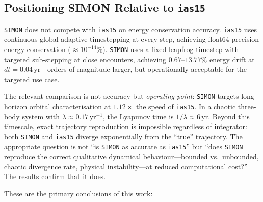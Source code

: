 \documentclass[12pt]{article}
\begin{document}
\subsection{Positioning SIMON Relative to \texttt{ias15}}

\texttt{SIMON} does not compete with \texttt{ias15} on energy conservation accuracy.
\texttt{ias15} uses continuous global adaptive timestepping at every step, achieving
float64-precision energy conservation ($\approx 10^{-14}\%$). \texttt{SIMON} uses a
fixed leapfrog timestep with targeted sub-stepping at close encounters, achieving
$0.67$--$13.77\%$ energy drift at $dt = 0.04$\,yr---orders of magnitude larger, but
operationally acceptable for the targeted use case.

The relevant comparison is not accuracy but \emph{operating point}: \texttt{SIMON}
targets long-horizon orbital characterisation at $1.12\times$ the speed of
\texttt{ias15}. In a chaotic three-body system with $\lambda \approx 0.17$\,yr$^{-1}$,
the Lyapunov time is $1/\lambda \approx 6$\,yr. Beyond this timescale, exact
trajectory reproduction is impossible regardless of integrator: both \texttt{SIMON}
and \texttt{ias15} diverge exponentially from the ``true'' trajectory. The appropriate
question is not ``is \texttt{SIMON} as accurate as \texttt{ias15}'' but ``does
\texttt{SIMON} reproduce the correct qualitative dynamical behaviour---bounded vs.\
unbounded, chaotic divergence rate, physical instability---at reduced computational
cost?'' The results confirm that it does.

These are the primary conclusions of this work:
\end{document}
